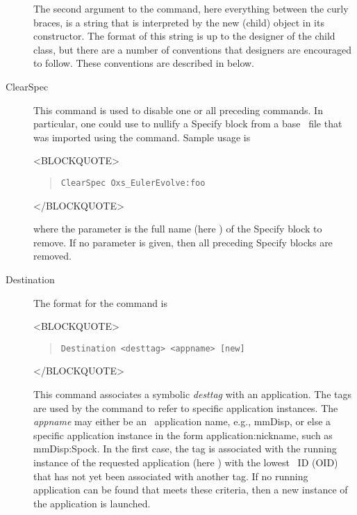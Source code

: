 \begin{description}
The second argument to the  command, here everything between
the curly braces, is a string that is interpreted by the new
 (child) object in its constructor.  The format of this
string is up to the designer of the child class, but there are a number
of conventions that designers are encouraged to follow.  These
conventions are described in 
  below.

\item[ClearSpec\label{html:mif2ClearSpec}]
This command is used to disable one or all preceding 
commands.  In particular, one could use  to nullify a
Specify block from a base \MIF\ file that was imported using the
 command.  Sample usage is
\begin{rawhtml}<BLOCKQUOTE>\end{rawhtml}
\begin{quote}
\begin{verbatim}
ClearSpec Oxs_EulerEvolve:foo
\end{verbatim}
\end{quote}
\begin{rawhtml}</BLOCKQUOTE>\end{rawhtml}
where the parameter is the full name (here ) of
the Specify block to remove.  If no parameter is given, then all
preceding Specify blocks are removed.

\item[Destination\label{html:destinationCmd}]
The format for the  command is
\begin{rawhtml}<BLOCKQUOTE>\end{rawhtml}
\begin{quote}
\begin{verbatim}
Destination <desttag> <appname> [new]
\end{verbatim}
\end{quote}
\begin{rawhtml}</BLOCKQUOTE>\end{rawhtml}
This command associates a symbolic \textit{desttag} with an
application.  The tags are used by the
 command
to refer to specific application instances.  The \textit{appname} may
either be an \OOMMF\ application name, e.g., mmDisp, or else a
specific application instance in the form application:nickname, such
as mmDisp:Spock.  In the first case, the tag is associated with the
running instance of the requested application (here ) with
the lowest \OOMMF\ ID (OID) that has not yet been associated with
another tag.  If no running application can be found that meets these
criteria, then a new instance of the application is launched.


\end{description}
